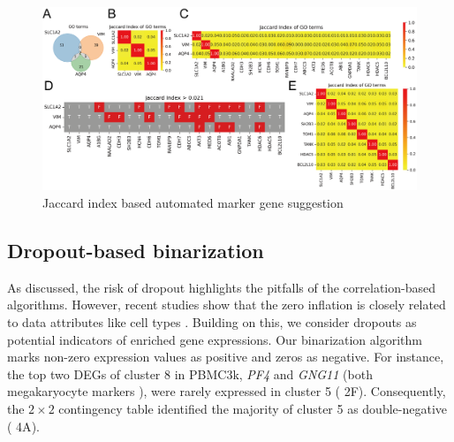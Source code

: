 \documentclass{article}
\begin{document}
\begin{figure}[htb]
  \centering
  \includegraphics[scale=0.7]{./figs/exported/figure_3.png}
  \caption{Jaccard index based automated marker gene suggestion}
  \label{jibased}
\end{figure}


\subsection*{Dropout-based binarization}
As discussed, the risk of dropout highlights the pitfalls of the correlation-based algorithms. However, recent studies 
show that the zero inflation is closely related to data attributes like cell types \cite{qiu2020embracing, zappia2017splatter}. Building on this, we consider 
dropouts as potential indicators of enriched gene expressions. Our binarization algorithm marks non-zero expression 
values as positive and zeros as negative. For instance, the top two DEGs of cluster 8 in PBMC3k, \textit{PF4} and \textit{GNG11} 
(both megakaryocyte markers \cite{puhm2023diversity}), were rarely expressed in cluster 5 (\figurename{ 2F}). Consequently, the 
$2\times 2$ contingency table identified the majority of cluster 5 as double-negative (\figurename{ 4A}).
\end{document}
